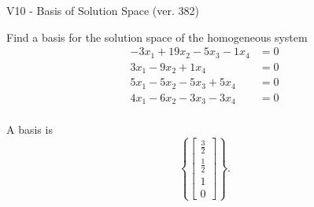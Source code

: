 \begin{exercise}
  \begin{exerciseTitle}V10 - Basis of Solution Space (ver. 382)\end{exerciseTitle}
  \begin{exerciseStatement}
    Find a basis for the solution space of the homogeneous system 
\begin{align*}
 -3 x_ 1 + 19 x_ 2 -5 x_ 3 -1 x_ 4 &= 0  \\ 
  3 x_ 1 -9 x_ 2 + 1 x_ 4 &= 0  \\ 
  5 x_ 1 -5 x_ 2 -5 x_ 3 + 5 x_ 4 &= 0  \\ 
  4 x_ 1 -6 x_ 2 -3 x_ 3 -3 x_ 4 &= 0  \\ 
 \end{align*}


 
  \end{exerciseStatement}

  \begin{exerciseAnswer}
   A basis is   
\[\left\{\left[\begin{array}{c}
\frac{3}{2} \\
\frac{1}{2} \\
1 \\
0
\end{array}\right]\right\}.\]

  


  \end{exerciseAnswer}
\end{exercise}